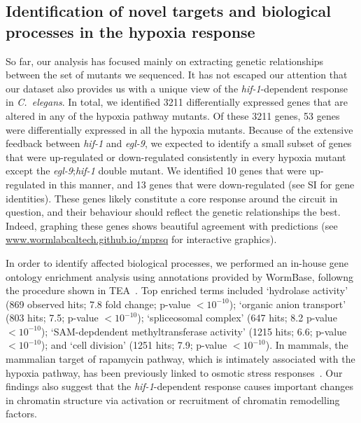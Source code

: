 \documentclass[9pt,twocolumn,twoside]{pnas-new}
\newcommand{\cel}{\emph{C.~elegans}}
\newcommand{\egl}{\emph{egl-9}}
\newcommand{\hif}{\emph{hif-1}}
\newcommand{\total}{3211}
\newcommand{\inall}{53}
\newcommand{\allup}{10}
\newcommand{\alldown}{13}
\begin{document}
\subsection{Identification of novel targets and biological processes in the hypoxia response}
\label{sub:new_biology}
So far, our analysis has focused mainly on extracting genetic relationships between the set of mutants we sequenced. It has not escaped our attention that our dataset also provides us with a unique view of the \hif{}-dependent response in \cel{}. In total, we identified \total{} differentially expressed genes that are altered in any of the hypoxia pathway mutants. Of these \total{} genes, \inall{} genes were differentially expressed in all the hypoxia mutants. Because of the extensive feedback between \hif{} and \egl{}, we expected to identify a small subset of genes that were up-regulated or down-regulated consistently in every hypoxia mutant except the \egl{};\hif{} double mutant.
We identified \allup{} genes that were up-regulated in this manner, and \alldown{} genes that were down-regulated (see SI for gene identities). These genes likely constitute a core response around the circuit in question, and their behaviour should reflect the genetic relationships the best. Indeed, graphing these genes shows beautiful agreement with predictions (see \url{www.wormlabcaltech.github.io/mprsq} for interactive graphics).

In order to identify affected biological processes, we performed an in-house gene ontology enrichment analysis using annotations provided by WormBase, followng the procedure shown in TEA~\cite{Angeles-Albores2016}. Top enriched terms included `hydrolase activity' (869 observed hits; 7.8 fold change; p-value $<10^{-10}$); `organic anion transport' (803 hits; 7.5; p-value $<10^{-10}$); `spliceosomal complex' (647 hits; 8.2 p-value $<10^{-10}$); `SAM-depdendent methyltransferase activity' (1215 hits; 6.6; p-value $<10^{-10}$); and `cell division' (1251 hits; 7.9; p-value $<10^{-10}$).
In mammals, the mammalian target of rapamycin pathway, which is intimately associated with the hypoxia pathway, has been previously linked to osmotic stress responses~\cite{Zhou2007}. Our findings also suggest that the \hif{}-dependent response causes important changes in chromatin structure via activation or recruitment of chromatin remodelling factors.
\end{document}
